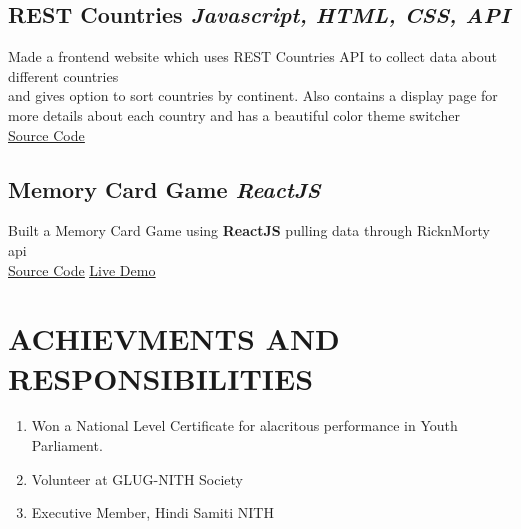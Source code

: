 \documentclass[12pt]{article}
\begin{document}
\subsection*{REST Countries \hfill \normalsize \textit{Javascript, HTML, CSS, API}}
  \parbox{\textwidth}{ Made a frontend website which uses REST Countries API to collect data about different countries\\
   and gives option to sort countries by continent. Also contains a display page for more details about each country and has a beautiful color theme switcher\\
   \underline{\href{https://github.com/HARSH-SHETH/REST_Countries_API}{Source Code}}
  }

  \vspace{2mm}

\subsection*{Memory Card Game \hfill \normalsize \textit{ReactJS}}
\parbox{\textwidth}{ Built a Memory Card Game using \textbf{ReactJS} pulling data through RicknMorty api
\\ 
\underline{\href{https://github.com/memory_card_game}{Source Code}}
\hfill \underline{\href{https://harsh-sheth.github.io/memory_card_game}{Live Demo}}
}

\section{ACHIEVMENTS AND RESPONSIBILITIES}
\begin{enumerate}
  \setlength{\itemsep}{0em}
  \item Won a National Level Certificate for alacritous performance in Youth Parliament.
  \item Volunteer at GLUG-NITH Society
  \item Executive Member, Hindi Samiti NITH
\end{enumerate}
\end{document}
